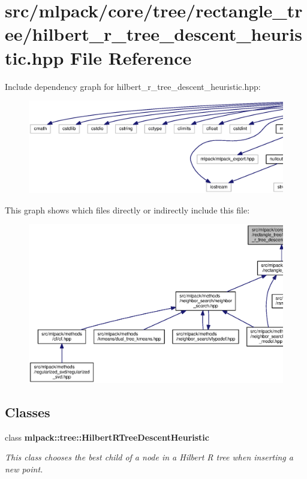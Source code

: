 \section{src/mlpack/core/tree/rectangle\+\_\+tree/hilbert\+\_\+r\+\_\+tree\+\_\+descent\+\_\+heuristic.hpp File Reference}
\label{hilbert__r__tree__descent__heuristic_8hpp}
Include dependency graph for hilbert\+\_\+r\+\_\+tree\+\_\+descent\+\_\+heuristic.\+hpp\+:
\nopagebreak
\begin{figure}[H]
\begin{center}
\leavevmode
\includegraphics[width=350pt]{hilbert__r__tree__descent__heuristic_8hpp__incl}
\end{center}
\end{figure}
This graph shows which files directly or indirectly include this file\+:
\nopagebreak
\begin{figure}[H]
\begin{center}
\leavevmode
\includegraphics[width=350pt]{hilbert__r__tree__descent__heuristic_8hpp__dep__incl}
\end{center}
\end{figure}
\subsection*{Classes}
\begin{DoxyCompactItemize}
\item 
class {\bf mlpack\+::tree\+::\+Hilbert\+R\+Tree\+Descent\+Heuristic}
\begin{DoxyCompactList}\small\item\em This class chooses the best child of a node in a Hilbert R tree when inserting a new point. \end{DoxyCompactList}\end{DoxyCompactItemize}
